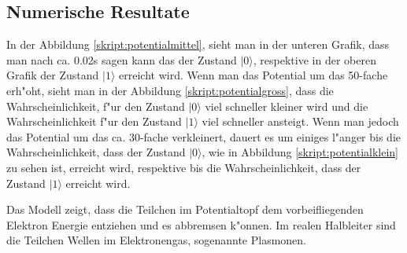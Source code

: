 \begin{refsection}
\subsection{Numerische Resultate}
In der Abbildung \ref{skript:potentialmittel}, sieht man in der unteren
Grafik, dass man nach ca. 0.02s sagen kann das der Zustand $|0\rangle$, 
respektive in der oberen Grafik der Zustand $|1\rangle$ erreicht wird.
Wenn man das Potential um das 50-fache erh"oht, sieht man in der Abbildung
\ref{skript:potentialgross}, dass die Wahrscheinlichkeit, f"ur  den Zustand
$|0\rangle$ viel schneller kleiner wird und die Wahrscheinlichkeit f"ur den
Zustand $|1\rangle$ viel schneller ansteigt.
Wenn man jedoch das Potential um das ca. 30-fache verkleinert, dauert es
um einiges l"anger bis die Wahrscheinlichkeit, dass der Zustand $|0\rangle$,
wie in Abbildung \ref{skript:potentialklein} zu sehen ist, erreicht wird,
respektive bis die Wahrscheinlichkeit, dass der Zustand $|1\rangle$ erreicht
wird.

Das Modell zeigt, dass die Teilchen im Potentialtopf dem vorbeifliegenden
Elektron Energie entziehen und es abbremsen k"onnen.
Im realen Halbleiter sind die Teilchen Wellen im Elektronengas,
sogenannte Plasmonen.
%


\printbibliography[heading=subbibliography]
\end{refsection}
